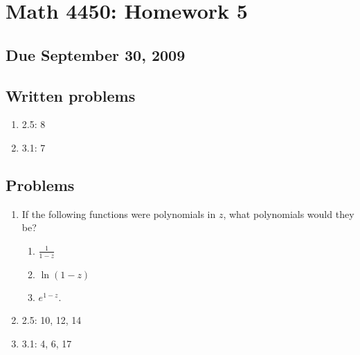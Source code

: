 \documentclass[11pt]{article}
\begin{document}
\section*{Math 4450:  Homework 5}
\subsection*{Due September 30, 2009}

\subsection*{Written problems}

\begin{enumerate}
\item 2.5: 8
\item 3.1: 7
\end{enumerate}

\subsection*{Problems}

\begin{enumerate}
\item If the following functions were polynomials in $z$, what polynomials would they be?
\begin{enumerate}
\item $\frac{1}{1-z}$
\item $\ln(1-z)$
\item $e^{1-z}$.
\end{enumerate}
\item 2.5: 10, 12, 14
\item 3.1: 4, 6, 17
\end{enumerate}
\end{document}
